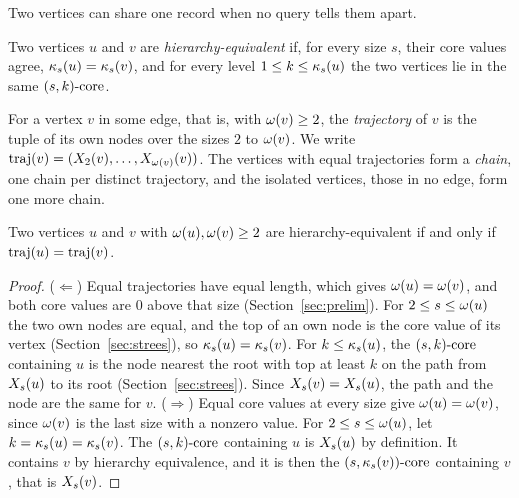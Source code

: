 Two vertices can share one record when no query tells them apart.
\begin{definition}\label{def:equiv}
Two vertices $u$ and $v$ are \textit{hierarchy-equivalent} if, for every size $s$, their core values agree, $\kappa_{s}(u)=\kappa_{s}(v)$, and for every level $1\le k\le\kappa_{s}(u)$ the two vertices lie in the same $(s,k)\text{-core}$.
\end{definition}
\begin{definition}\label{def:chain}
For a vertex $v$ in some edge, that is, with $\omega(v)\ge2$, the \textit{trajectory} of $v$ is the tuple of its own nodes over the sizes $2$ to $\omega(v)$.
%
We write $\mathrm{traj}(v)=(X_{2}(v),\dots,X_{\omega(v)}(v))$.
%
The vertices with equal trajectories form a \textit{chain}, one chain per distinct trajectory, and the isolated vertices, those in no edge, form one more chain.
\end{definition}
\begin{theorem}\label{thm:chains}
Two vertices $u$ and $v$ with $\omega(u),\omega(v)\ge2$ are hierarchy-equivalent if and only if $\mathrm{traj}(u)=\mathrm{traj}(v)$.
\end{theorem}
\begin{proof}
($\Leftarrow$) Equal trajectories have equal length, which gives $\omega(u)=\omega(v)$, and both core values are $0$ above that size (Section~\ref{sec:prelim}).
%
For $2\le s\le\omega(u)$ the two own nodes are equal, and the top of an own node is the core value of its vertex (Section~\ref{sec:strees}), so $\kappa_{s}(u)=\kappa_{s}(v)$.
%
For $k\le\kappa_{s}(u)$, the $(s,k)\text{-core}$ containing $u$ is the node nearest the root with top at least $k$ on the path from $X_{s}(u)$ to its root (Section~\ref{sec:strees}).
%
Since $X_{s}(v)=X_{s}(u)$, the path and the node are the same for $v$.
%
($\Rightarrow$) Equal core values at every size give $\omega(u)=\omega(v)$, since $\omega(v)$ is the last size with a nonzero value.
%
For $2\le s\le\omega(u)$, let $k=\kappa_{s}(u)=\kappa_{s}(v)$.
%
The $(s,k)\text{-core}$ containing $u$ is $X_{s}(u)$ by definition.
%
It contains $v$ by hierarchy equivalence, and it is then the $(s,\kappa_{s}(v))\text{-core}$ containing $v$, that is $X_{s}(v)$.
\end{proof}
